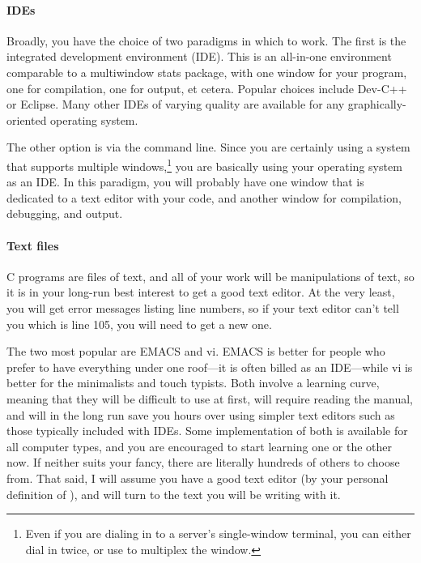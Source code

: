 \documentclass[12pt]{article}
\def\ind#1{\index{#1}#1}
\begin{document}
\paragraph{IDEs}  
Broadly, you have the choice of two paradigms in which to work. The
first is the integrated development environment (IDE). This is an
all-in-one environment comparable to a multiwindow stats package, with
one window for your program, one for compilation, one for output, et
cetera.  
Popular choices include Dev-C++ or Eclipse. Many other IDEs of varying
quality are available for any graphically-oriented operating system.

The other option is via the command line. Since you are certainly using
a system that supports multiple windows,\footnote{Even if you are
dialing in to a server's single-window terminal, you can either dial in
twice, or use  to multiplex the window.} 
you are basically using your operating system as an IDE.
In this paradigm, you will probably have one window that is dedicated to
a text editor with your code, and another window for compilation,
debugging, and output.



\paragraph{Text files} C programs are files of text, and all of your work
will be manipulations of text, so it is in your long-run best interest to
get a good \ind{text editor}. At the very least, you will get error messages
listing line numbers, so if your text editor can't tell you which is
line 105, you will need to get a new one.

The two most popular are \ind{EMACS} and \ind{vi}. EMACS is better for
people who prefer to have everything under one roof---it is often billed
as an IDE---while vi is better for the minimalists and touch typists. Both
involve a learning curve, meaning that they will be difficult to use at
first, will require reading the manual, and will in the long run save
you hours over using simpler text editors such as those typically
included with IDEs. Some implementation of both is available for all
computer types, and you are encouraged to start learning one or the other
now. If neither suits your fancy, there are literally hundreds of others
to choose from. That said, I will assume you have a good text editor
(by your personal definition of ), and will turn to the text you
will be writing with it.
\ifbook \else 
	
\fi
\end{document}
